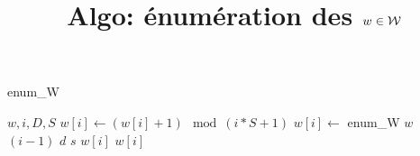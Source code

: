 \documentclass[10pt,a4paper]{article}
\title{Algo: énumération des $w\in\mathcal{W}$}
\begin{document}
\maketitle

\begin{algorithm}
  \caption{enum\_W}
  \begin{algorithmic}
    \REQUIRE $w,i,D,S$
    \STATE $w[i]\leftarrow (w[i]+1)\mod (i*S+1)$
    \STATE $w[i]\leftarrow$ enum\_W $w$ $(i-1)$ $d$ $s$
    \RETURN $w[i]$
    \ELSE
    \RETURN $w[i]$
    \ENDIF
  \end{algorithmic}
\end{algorithm}
\end{document}
